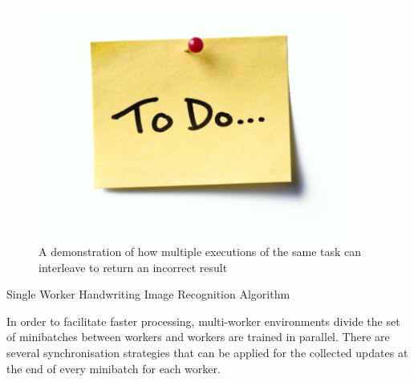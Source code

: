 \documentclass[12pt]{article}
\begin{document}
\begin{figure}[H]
  \centering
  \includegraphics[width=4in]{todo}
  \caption[]{A demonstration of how multiple executions of the same task can interleave to return an incorrect result}
  \label{ParameterServerArchitecture}
\end{figure}

\IncMargin{1em}
\begin{algorithm}[H]
 \BlankLine

 \caption{Single Worker Handwriting Image Recognition Algorithm}
 \label{SingleWorkerMachineLearningAlgorithm}
\end{algorithm}
\DecMargin{1em}
\medskip
In order to facilitate faster processing, multi-worker environments divide the set of minibatches between workers and workers are trained in parallel. There are several synchronisation strategies that can be applied for the collected updates at the end of every minibatch for each worker.
\end{document}
